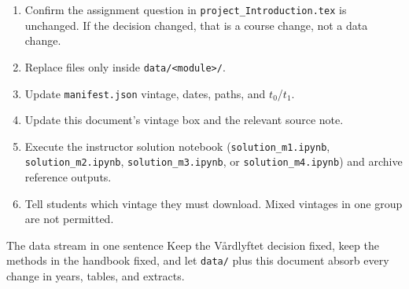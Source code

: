 \documentclass[11pt,a4paper]{article}
\begin{document}
\begin{enumerate}
    \item Confirm the assignment question in \texttt{project\_Introduction.tex}
    is unchanged. If the decision changed, that is a course change, not
    a data change.
    \item Replace files only inside \texttt{data/<module>/}.
    \item Update \texttt{manifest.json} vintage, dates, paths, and
    $t_0$/$t_1$.
    \item Update this document's vintage box and the relevant source
    note.
    \item Execute the instructor solution notebook
    (\texttt{solution\_m1.ipynb}, \texttt{solution\_m2.ipynb},
    \texttt{solution\_m3.ipynb}, or \texttt{solution\_m4.ipynb})
    and archive reference outputs.
    \item Tell students which vintage they must download. Mixed vintages
    in one group are not permitted.
\end{enumerate}

\begin{casebox}{The data stream in one sentence}
Keep the V{\aa}rdlyftet decision fixed, keep the methods in the handbook
fixed, and let \texttt{data/} plus this document absorb every change in
years, tables, and extracts.
\end{casebox}
\end{document}
